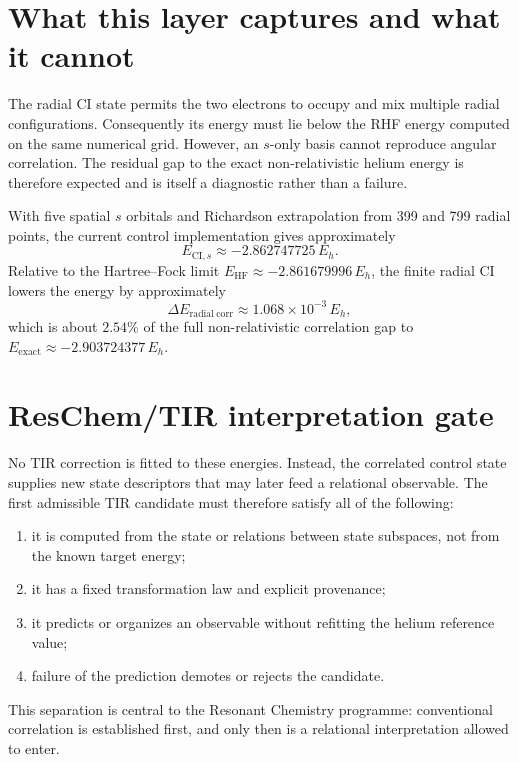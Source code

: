 \section{What this layer captures and what it cannot}
The radial CI state permits the two electrons to occupy and mix multiple radial configurations. Consequently its energy must lie below the RHF energy computed on the same numerical grid. However, an $s$-only basis cannot reproduce angular correlation. The residual gap to the exact non-relativistic helium energy is therefore expected and is itself a diagnostic rather than a failure.

With five spatial $s$ orbitals and Richardson extrapolation from 399 and 799 radial points, the current control implementation gives approximately
\begin{equation}
E_{\mathrm{CI},s}\approx -2.862747725\,E_h.
\end{equation}
Relative to the Hartree--Fock limit $E_{\mathrm{HF}}\approx -2.861679996\,E_h$, the finite radial CI lowers the energy by approximately
\begin{equation}
\Delta E_{\mathrm{radial\ corr}}\approx 1.068\times10^{-3}\,E_h,
\end{equation}
which is about $2.54\%$ of the full non-relativistic correlation gap to $E_{\mathrm{exact}}\approx -2.903724377\,E_h$.

\section{ResChem/TIR interpretation gate}
No TIR correction is fitted to these energies. Instead, the correlated control state supplies new state descriptors that may later feed a relational observable. The first admissible TIR candidate must therefore satisfy all of the following:
\begin{enumerate}
\item it is computed from the state or relations between state subspaces, not from the known target energy;
\item it has a fixed transformation law and explicit provenance;
\item it predicts or organizes an observable without refitting the helium reference value;
\item failure of the prediction demotes or rejects the candidate.
\end{enumerate}

This separation is central to the Resonant Chemistry programme: conventional correlation is established first, and only then is a relational interpretation allowed to enter.
